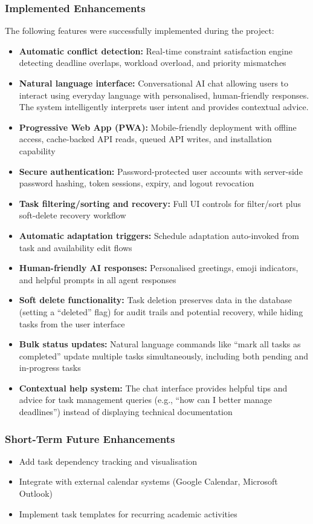 \documentclass[12pt]{article}
\begin{document}
\subsubsection{Implemented Enhancements}
The following features were successfully implemented during the project:
\begin{itemize}
    \item \textbf{Automatic conflict detection:} Real-time constraint satisfaction engine detecting deadline overlaps, workload overload, and priority mismatches
    \item \textbf{Natural language interface:} Conversational AI chat allowing users to interact using everyday language with personalised, human-friendly responses. The system intelligently interprets user intent and provides contextual advice.
    \item \textbf{Progressive Web App (PWA):} Mobile-friendly deployment with offline access, cache-backed API reads, queued API writes, and installation capability
    \item \textbf{Secure authentication:} Password-protected user accounts with server-side password hashing, token sessions, expiry, and logout revocation
    \item \textbf{Task filtering/sorting and recovery:} Full UI controls for filter/sort plus soft-delete recovery workflow
    \item \textbf{Automatic adaptation triggers:} Schedule adaptation auto-invoked from task and availability edit flows
    \item \textbf{Human-friendly AI responses:} Personalised greetings, emoji indicators, and helpful prompts in all agent responses
    \item \textbf{Soft delete functionality:} Task deletion preserves data in the database (setting a ``deleted'' flag) for audit trails and potential recovery, while hiding tasks from the user interface
    \item \textbf{Bulk status updates:} Natural language commands like ``mark all tasks as completed'' update multiple tasks simultaneously, including both pending and in-progress tasks
    \item \textbf{Contextual help system:} The chat interface provides helpful tips and advice for task management queries (e.g., ``how can I better manage deadlines'') instead of displaying technical documentation
\end{itemize}

\subsubsection{Short-Term Future Enhancements}
\begin{itemize}
    \item Add task dependency tracking and visualisation
    \item Integrate with external calendar systems (Google Calendar, Microsoft Outlook)
    \item Implement task templates for recurring academic activities
\end{itemize}
\end{document}

